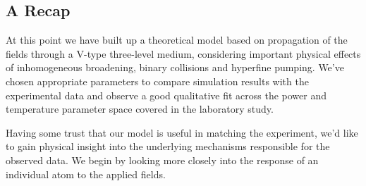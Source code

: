   \subsection{A Recap}

    At this point we have built up a theoretical model based on propagation of
    the fields through a V-type three-level medium, considering important
    physical effects of inhomogeneous broadening, binary collisions and
    hyperfine pumping. We've chosen appropriate parameters to compare simulation
    results with the experimental data and observe a good qualitative fit across
    the power and temperature parameter space covered in the laboratory study.

    Having some trust that our model is useful in matching the experiment, we'd
    like to gain physical insight into the underlying mechanisms responsible for
    the observed data. We begin by looking more closely into the response of an
    individual atom to the applied fields.
